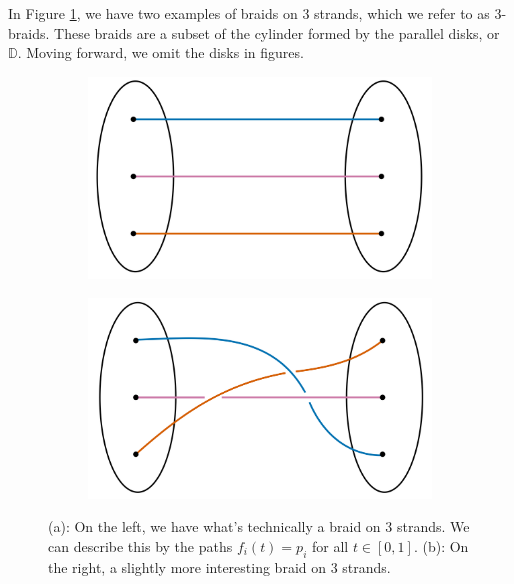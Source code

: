 \documentclass{amsart}
\begin{document}
\begin{example}
	In Figure \ref{3-braids}, we have two examples of braids on \(3\) strands,
	which we refer to as \(3\)-braids. These braids are a subset of the
	cylinder formed by the parallel disks, or \(\mathbb{D}\). Moving
	forward, we omit the disks in figures.

	\begin{figure}[!h]
		\begin{subfigure}{.5\textwidth}
			\centering
			\includegraphics[width=.9\linewidth]{Inkscape Files/identityonthree.png}
			\caption{}
		\end{subfigure}%
		\begin{subfigure}{.5\textwidth}
			\centering
			\includegraphics[width=.9\linewidth]{Inkscape Files/threebraid1.png}
			\caption{}
		\end{subfigure}%
		\caption{(a): On the left, we have what's technically a braid on 3
		strands. We can describe this by the paths \(f_i(t) = p_i\) for all
		\(t\in [0, 1]\). (b): On the right, a slightly more interesting braid on
		3 strands.}
		\label{3-braids}
	\end{figure}
\end{example}
\end{document}
